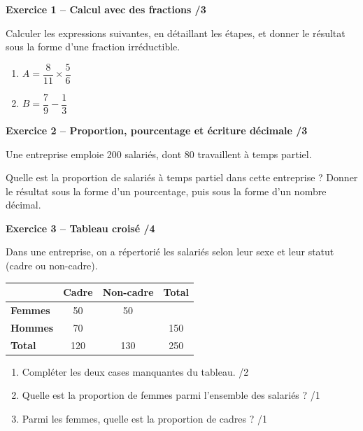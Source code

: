 \documentclass[10pt,a4paper]{article}
\begin{document}
\newpage



\textbf{Exercice 1 -- Calcul avec des fractions \hfill /3}

Calculer les expressions suivantes, en détaillant les étapes, et donner le résultat sous la forme d'une fraction irréductible.

\begin{enumerate}
\item \(A = \dfrac{8}{11}\times\dfrac{5}{6}\)

\vspace{2.5cm}

\item \(B = \dfrac{7}{9}-\dfrac{1}{3}\)

\vspace{2.5cm}
\end{enumerate}

\textbf{Exercice 2 -- Proportion, pourcentage et écriture décimale \hfill /3}

Une entreprise emploie 200 salariés, dont 80 travaillent à temps partiel.

Quelle est la proportion de salariés à temps partiel dans cette entreprise ? Donner le résultat sous la forme d'un pourcentage, puis sous la forme d'un nombre décimal.

\vspace{3cm}

\textbf{Exercice 3 -- Tableau croisé \hfill /4}

Dans une entreprise, on a répertorié les salariés selon leur sexe et leur statut (cadre ou non-cadre).

\begin{center}
\renewcommand{\arraystretch}{1.5}
\begin{tabular}{|l|c|c|c|}
\hline
 & \textbf{Cadre} & \textbf{Non-cadre} & \textbf{Total} \\
\hline
\textbf{Femmes} & 50 & 50 & \\
\hline
\textbf{Hommes} & 70 & & 150 \\
\hline
\textbf{Total} & 120 & 130 & 250 \\
\hline
\end{tabular}
\end{center}

\begin{enumerate}
\item Compléter les deux cases manquantes du tableau. \hfill /2

\vspace{1.5cm}

\item Quelle est la proportion de femmes parmi l'ensemble des salariés ? \hfill /1

\vspace{1.5cm}

\item Parmi les femmes, quelle est la proportion de cadres ? \hfill /1
\end{enumerate}
\end{document}
